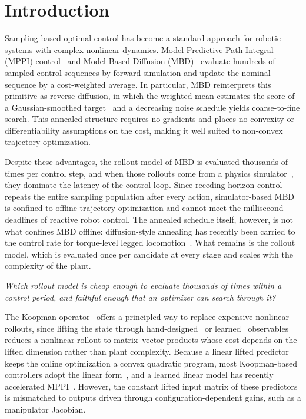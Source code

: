 \documentclass[letterpaper,10pt,conference]{ieeeconf}
\begin{document}
\section{Introduction}\label{sec:intro}
Sampling-based optimal control has become a standard approach for robotic systems with complex nonlinear dynamics.
Model Predictive Path Integral (MPPI) control~\cite{kappen2005, theodorou2010, williams2017mppi, williams2016aggressive} and Model-Based Diffusion (MBD)~\cite{pan2024model} evaluate hundreds of sampled control sequences by forward simulation and update the nominal sequence by a cost-weighted average.
In particular, MBD reinterprets this primitive as reverse diffusion, in which the weighted mean estimates the score of a Gaussian-smoothed target~\cite{song2019generative, song2020score} and a decreasing noise schedule yields coarse-to-fine search.
This annealed structure requires no gradients and places no convexity or differentiability assumptions on the cost, making it well suited to non-convex trajectory optimization.

Despite these advantages, the rollout model of MBD is evaluated thousands of times per control step, and when those rollouts come from a physics simulator~\cite{pan2024model}, they dominate the latency of the control loop.
Since receding-horizon control repeats the entire sampling population after every action, simulator-based MBD is confined to offline trajectory optimization and cannot meet the millisecond deadlines of reactive robot control.
The annealed schedule itself, however, is not what confines MBD offline: diffusion-style annealing has recently been carried to the control rate for torque-level legged locomotion~\cite{xue2025full}.
What remains is the rollout model, which is evaluated once per candidate at every stage and scales with the complexity of the plant.

\emph{Which rollout model is cheap enough to evaluate thousands of times within a control period, and faithful enough that an optimizer can search through it?}

The Koopman operator~\cite{koopman1931, mezic2005} offers a principled way to replace expensive nonlinear rollouts, since lifting the state through hand-designed~\cite{williams2015edmd, proctor2016dmdc} or learned~\cite{lusch2018deep} observables reduces a nonlinear rollout to matrix--vector products whose cost depends on the lifted dimension rather than plant complexity.
Because a linear lifted predictor keeps the online optimization a convex quadratic program, most Koopman-based controllers adopt the linear form~\cite{korda2018mpc, strasser2026}, and a learned linear model has recently accelerated MPPI~\cite{mppidk2026}.
However, the constant lifted input matrix of these predictors is mismatched to outputs driven through configuration-dependent gains, such as a manipulator Jacobian.
\end{document}

